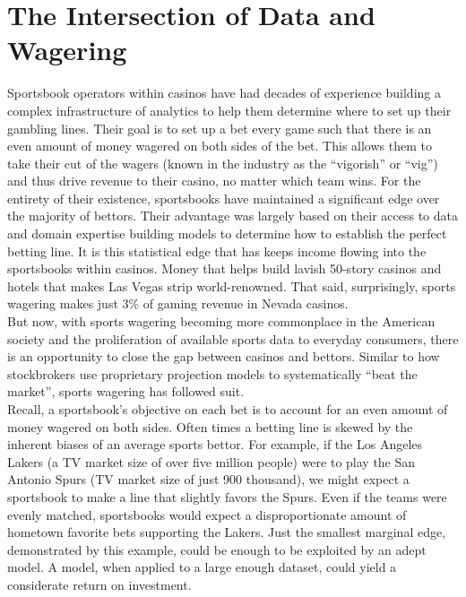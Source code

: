 \documentclass [MS] {uclathes}
\begin{document}
\section{The Intersection of Data and Wagering}
\noindent Sportsbook operators within casinos have had decades of experience building a complex infrastructure of analytics to help them determine where to set up their gambling lines. Their goal is to set up a bet every game such that there is an even amount of money wagered on both sides of the bet. This allows them to take their cut of the wagers (known in the industry as the ``vigorish'' or ``vig'') and thus drive revenue to their casino, no matter which team wins. For the entirety of their existence, sportsbooks have maintained a significant edge over the majority of bettors. Their advantage was largely based on their access to data and domain expertise building models to determine how to establish the perfect betting line. It is this statistical edge that has keeps income flowing into the sportsbooks within casinos. Money that helps build lavish 50-story casinos and hotels that makes Las Vegas strip world-renowned. That said, surprisingly, sports wagering makes just 3\% of gaming revenue in Nevada casinos. \\

\noindent But now, with sports wagering becoming more commonplace in the American society and the proliferation of available sports data to everyday consumers, there is an opportunity to close the gap between casinos and bettors. Similar to how stockbrokers use proprietary projection models to systematically ``beat the market'', sports wagering has followed suit. \\

\noindent Recall, a sportsbook's objective on each bet is to account for an even amount of money wagered on both sides. Often times a betting line is skewed by the inherent biases of an average sports bettor. For example, if the Los Angeles Lakers (a TV market size of over five million people) were to play the San Antonio Spurs (TV market size of just 900 thousand), we might expect a sportsbook to make a line that slightly favors the Spurs. Even if the teams were evenly matched, sportsbooks would expect a disproportionate amount of hometown favorite bets supporting the Lakers. Just the smallest marginal edge, demonstrated by this example, could be enough to be exploited by an adept model. A model, when applied to a large enough dataset, could yield a considerate return on investment. \\
\end{document}
